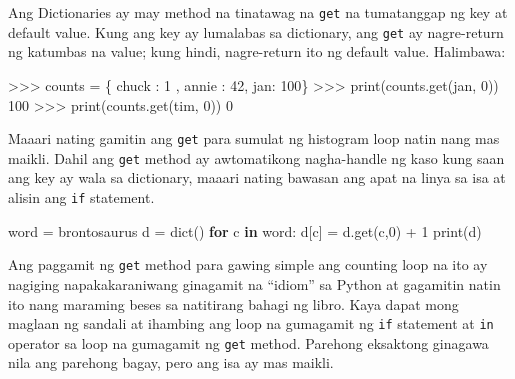 \documentclass[10pt,]{book}
\newenvironment{Shaded}{}{}
\newcommand{\BuiltInTok}[1]{\textcolor[rgb]{0.00,0.50,0.00}{#1}}
\newcommand{\ControlFlowTok}[1]{\textcolor[rgb]{0.00,0.44,0.13}{\textbf{#1}}}
\newcommand{\DecValTok}[1]{\textcolor[rgb]{0.25,0.63,0.44}{#1}}
\newcommand{\KeywordTok}[1]{\textcolor[rgb]{0.00,0.44,0.13}{\textbf{#1}}}
\newcommand{\NormalTok}[1]{#1}
\newcommand{\OperatorTok}[1]{\textcolor[rgb]{0.40,0.40,0.40}{#1}}
\newcommand{\StringTok}[1]{\textcolor[rgb]{0.25,0.44,0.63}{#1}}
\begin{document}
 

Ang Dictionaries ay may method na tinatawag na \texttt{get} na
tumatanggap ng key at default value. Kung ang key ay lumalabas sa
dictionary, ang \texttt{get} ay nagre-return ng katumbas na value; kung
hindi, nagre-return ito ng default value. Halimbawa:

\begin{Shaded}
\begin{Highlighting}[]
\OperatorTok{\textgreater{}\textgreater{}\textgreater{}}\NormalTok{ counts }\OperatorTok{=}\NormalTok{ \{ }\StringTok{\textquotesingle{}chuck\textquotesingle{}}\NormalTok{ : }\DecValTok{1}\NormalTok{ , }\StringTok{\textquotesingle{}annie\textquotesingle{}}\NormalTok{ : }\DecValTok{42}\NormalTok{, }\StringTok{\textquotesingle{}jan\textquotesingle{}}\NormalTok{: }\DecValTok{100}\NormalTok{\}}
\OperatorTok{\textgreater{}\textgreater{}\textgreater{}} \BuiltInTok{print}\NormalTok{(counts.get(}\StringTok{\textquotesingle{}jan\textquotesingle{}}\NormalTok{, }\DecValTok{0}\NormalTok{))}
\DecValTok{100}
\OperatorTok{\textgreater{}\textgreater{}\textgreater{}} \BuiltInTok{print}\NormalTok{(counts.get(}\StringTok{\textquotesingle{}tim\textquotesingle{}}\NormalTok{, }\DecValTok{0}\NormalTok{))}
\DecValTok{0}
\end{Highlighting}
\end{Shaded}

Maaari nating gamitin ang \texttt{get} para sumulat ng histogram loop
natin nang mas maikli. Dahil ang \texttt{get} method ay awtomatikong
nagha-handle ng kaso kung saan ang key ay wala sa dictionary, maaari
nating bawasan ang apat na linya sa isa at alisin ang \texttt{if}
statement.

\begin{Shaded}
\begin{Highlighting}[]
\NormalTok{word }\OperatorTok{=} \StringTok{\textquotesingle{}brontosaurus\textquotesingle{}}
\NormalTok{d }\OperatorTok{=} \BuiltInTok{dict}\NormalTok{()}
\ControlFlowTok{for}\NormalTok{ c }\KeywordTok{in}\NormalTok{ word:}
\NormalTok{    d[c] }\OperatorTok{=}\NormalTok{ d.get(c,}\DecValTok{0}\NormalTok{) }\OperatorTok{+} \DecValTok{1}
\BuiltInTok{print}\NormalTok{(d)}
\end{Highlighting}
\end{Shaded}

Ang paggamit ng \texttt{get} method para gawing simple ang counting loop
na ito ay nagiging napakakaraniwang ginagamit na ``idiom'' sa Python at
gagamitin natin ito nang maraming beses sa natitirang bahagi ng libro.
Kaya dapat mong maglaan ng sandali at ihambing ang loop na gumagamit ng
\texttt{if} statement at \texttt{in} operator sa loop na gumagamit ng
\texttt{get} method. Parehong eksaktong ginagawa nila ang parehong
bagay, pero ang isa ay mas maikli.
\end{document}
